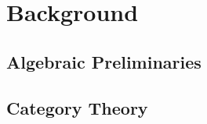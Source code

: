 \chapter{Background}\label{\positionnumber} 
    \section{Algebraic Preliminaries}
        \begin{definition}
            
        \end{definition}

        \begin{definition}[Monoid]
         
        \end{definition}
        
        \begin{definition}
         
        \end{definition}
        
        \begin{theorem}
         
        \end{theorem}


    \section{Category Theory}
        

